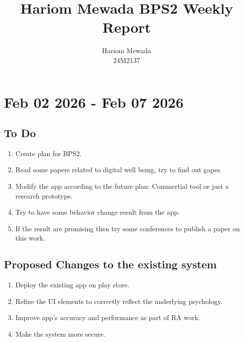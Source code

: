 \documentclass[12pt]{article}
\begin{document}
\title{Hariom Mewada BPS2 Weekly Report}
\author{Hariom Mewada\\
24M2137}
\maketitle

\newpage
\tableofcontents
\newpage

\section{Feb 02 2026 - Feb 07 2026}
\subsection{To Do}
\begin{enumerate}
    \item Create plan for BPS2.
    \item Read some papers related to digital well being, try to find out gapes.
    \item Modify the app according to the future plan: Commertial tool or just a research prototype.
    \item Try to have some behavior change result from the app.
    \item If the result are promising then try some conferences to publish a paper on this work.
\end{enumerate}
\subsection{Proposed Changes to the existing system}
\begin{enumerate}
    \item  Deploy the existing app on play store.
    \item Refine the UI elements to correctly reflect the underlying psychology.
    \item Improve app's accuracy and performance as part of RA work.
    \item Make the system more secure.
\end{enumerate}
\end{document}
